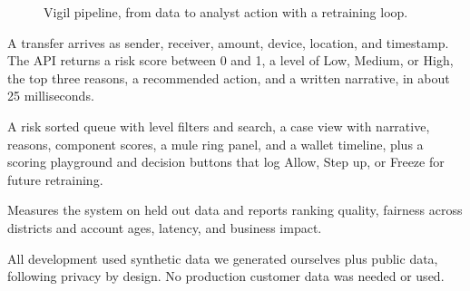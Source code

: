 \documentclass[11pt,a4paper]{article}
\begin{document}
\begin{figure}[htbp]
\centering
{}
\caption{Vigil pipeline, from data to analyst action with a retraining loop.}
\label{fig:arch}
\end{figure}

\begin{description}[nosep]
  \item[Scoring API (FastAPI).] A transfer arrives as sender, receiver,
    amount, device, location, and timestamp. The API returns a risk score
    between 0 and 1, a level of Low, Medium, or High, the top three reasons,
    a recommended action, and a written narrative, in about 25 milliseconds.
  \item[Analyst console (static web page).] A risk sorted queue with level
    filters and search, a case view with narrative, reasons, component
    scores, a mule ring panel, and a wallet timeline, plus a scoring
    playground and decision buttons that log Allow, Step up, or Freeze for
    future retraining.
  \item[Evaluation harness.] Measures the system on held out data and reports
    ranking quality, fairness across districts and account ages, latency, and
    business impact.
\end{description}
All development used synthetic data we generated ourselves plus public data,
following privacy by design. No production customer data was needed or used.
\end{document}
